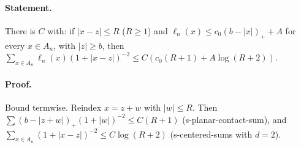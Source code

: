 \paragraph{Statement.} There is $C$ with: if $|x-z|\leq R$ ($R\geq1$) and $\ell_n(x)\leq c_0(b-|x|)_++A$ for every $x\in A_n$, with $|z|\geq b$, then
$\sum_{x\in A_n}\ell_n(x)(1+|x-z|)^{-2}\leq C(c_0(R+1)+A\log(R+2))$.
\paragraph{Proof.} Bound termwise. Reindex $x=z+w$ with $|w|\leq R$. Then $\sum(b-|z+w|)_+(1+|w|)^{-2}\leq C(R+1)$ (s-planar-contact-sum), and
$\sum_{x\in A_n}(1+|x-z|)^{-2}\leq C\log(R+2)$ (s-centered-sums with $d=2$).

